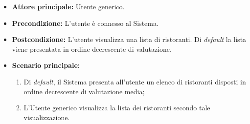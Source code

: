 \label{usecase:Visualizzazione elenco ristoranti}
\begin{itemize}
	\item \textbf{Attore principale:} Utente generico.

	\item \textbf{Precondizione:}
	      L'utente è connesso al Sistema.

	\item \textbf{Postcondizione:} L'utente visualizza una lista di ristoranti. Di \textit{default} la lista viene presentata in ordine decrescente di valutazione.

	\item \textbf{Scenario principale:}
	      \begin{enumerate}
              \item Di \textit{default}, il Sistema presenta all'utente un elenco di ristoranti disposti in ordine decrescente di valutazione media;
              
		      \item L'Utente generico visualizza la lista dei ristoranti secondo tale visualizzazione.
		    
	      \end{enumerate}
\end{itemize}
